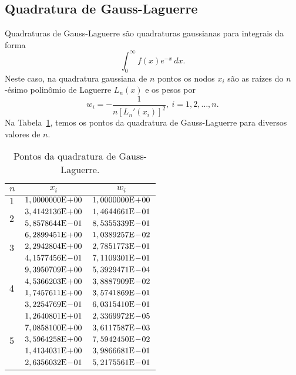 \subsection{Quadratura de Gauss-Laguerre}

Quadraturas de Gauss-Laguerre são quadraturas gaussianas para integrais da forma
\begin{equation}
  \int_{0}^\infty f(x)e^{-x}\,dx.
\end{equation}
Neste caso, na quadratura gaussiana de $n$ pontos os nodos $x_i$ são as raízes do $n$-ésimo polinômio de Laguerre $L_n(x)$ e os pesos por
\begin{equation}
  w_i = -\frac{1}{n[L_n'(x_i)]^2},~i=1, 2, \dotsc, n.
\end{equation}
Na Tabela~\ref{tab:quad_GLa}, temos os pontos da quadratura de Gauss-Laguerre para diversos valores de $n$.

\begin{table}[h!]
  \centering
  \caption{Pontos da quadratura de Gauss-Laguerre.}
  \begin{tabular}{lcc}
    $n$ & $x_i$ & $w_i$ \\\hline
    $1$ & $1,0000000\mathrm{E}\!+\!00$ & $1,0000000\mathrm{E}\!+\!00$ \\\hline
    \multirow{2}{*}{2}
        & $3,4142136\mathrm{E}\!+\!00$ & $1,4644661\mathrm{E}\!-\!01$ \\
        & $5,8578644\mathrm{E}\!-\!01$ & $8,5355339\mathrm{E}\!-\!01$ \\\hline
    \multirow{3}{*}{3}
        & $6,2899451\mathrm{E}\!+\!00$ & $1,0389257\mathrm{E}\!-\!02$ \\
        & $2,2942804\mathrm{E}\!+\!00$ & $2,7851773\mathrm{E}\!-\!01$ \\
        & $4,1577456\mathrm{E}\!-\!01$ & $7,1109301\mathrm{E}\!-\!01$ \\\hline
    \multirow{4}{*}{4}
        & $9,3950709\mathrm{E}\!+\!00$ & $5,3929471\mathrm{E}\!-\!04$ \\
        & $4,5366203\mathrm{E}\!+\!00$ & $3,8887909\mathrm{E}\!-\!02$ \\
        & $1,7457611\mathrm{E}\!+\!00$ & $3,5741869\mathrm{E}\!-\!01$ \\
        & $3,2254769\mathrm{E}\!-\!01$ & $6,0315410\mathrm{E}\!-\!01$ \\\hline
    \multirow{5}{*}{5}
        & $1,2640801\mathrm{E}\!+\!01$ & $2,3369972\mathrm{E}\!-\!05$ \\
        & $7,0858100\mathrm{E}\!+\!00$ & $3,6117587\mathrm{E}\!-\!03$ \\
        & $3,5964258\mathrm{E}\!+\!00$ & $7,5942450\mathrm{E}\!-\!02$ \\
        & $1,4134031\mathrm{E}\!+\!00$ & $3,9866681\mathrm{E}\!-\!01$ \\
        & $2,6356032\mathrm{E}\!-\!01$ & $5,2175561\mathrm{E}\!-\!01$ \\\hline
  \end{tabular}
  \label{tab:quad_GLa}
\end{table}

